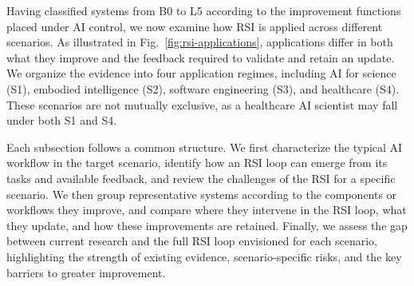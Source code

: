 

Having classified systems from B0 to L5 according to the improvement functions placed under AI control, we now examine how RSI is applied across different scenarios. As illustrated in Fig.~\ref{fig:rsi-applications}, applications differ in both what they improve and the feedback required to validate and retain an update. We organize the evidence into four application regimes, including AI for science (S1), embodied intelligence (S2), software engineering (S3), and healthcare (S4). These scenarios are not mutually exclusive, as a healthcare AI scientist may fall under both S1 and S4.



Each subsection follows a common structure. We first characterize the typical AI workflow in the target scenario, identify how an RSI loop can emerge from its tasks and available feedback, and review the challenges of the RSI for a specific scenario. We then group representative systems according to the components or workflows they improve, and compare where they intervene in the RSI loop, what they update, and how these improvements are retained. Finally, we assess the gap between current research and the full RSI loop envisioned for each scenario, highlighting the strength of existing evidence, scenario-specific risks, and the key barriers to greater improvement.






